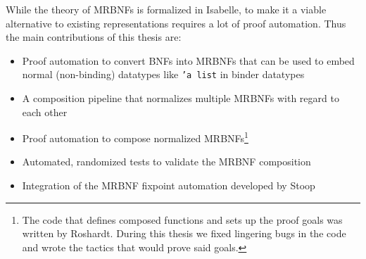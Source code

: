 While the theory of \acp{MRBNF} is formalized in Isabelle, to make it a viable alternative to existing representations requires a lot of proof automation. Thus the main contributions of this thesis are:

\begin{itemize}
\item{Proof automation to convert \acp{BNF} into \acp{MRBNF} that can be used to embed normal (non-binding) datatypes like \texttt{'a list} in binder datatypes}
\item{A composition pipeline that normalizes multiple \acp{MRBNF} with regard to each other}
\item{Proof automation to compose normalized \acp{MRBNF}\footnote{The code that defines composed functions and sets up the proof goals was written by Roshardt\cite{mrbnf_composition}. During this thesis we fixed lingering bugs in the code and wrote the tactics that would prove said goals.}}
\item{Automated, randomized tests to validate the \ac{MRBNF} composition}
\item{Integration of the \ac{MRBNF} fixpoint automation developed by Stoop\cite{mrbnf_fixpoint}}
\end{itemize}

